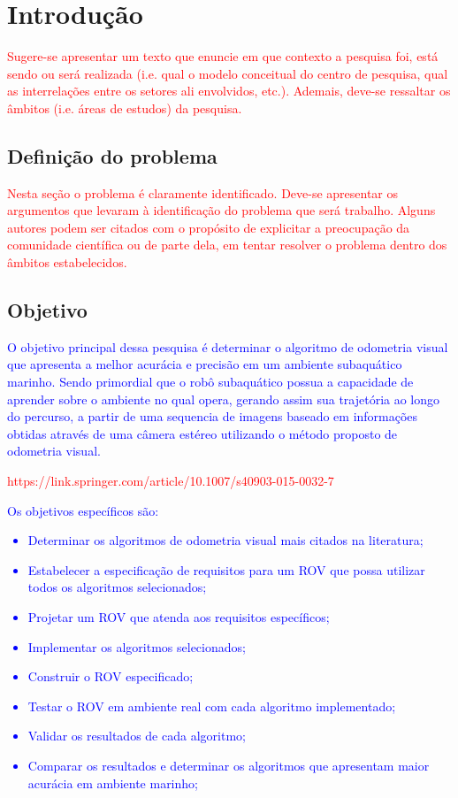 \chapter{Introdu\c{c}\~ao}
\label{chapter:introducao}

\textcolor{red}{Sugere-se apresentar um texto que enuncie em que contexto a pesquisa foi, est\'a sendo ou ser\'a realizada (i.e. qual o modelo conceitual do centro de pesquisa, qual as interrela\c{c}\~oes entre os setores ali envolvidos, etc.). Ademais, deve-se ressaltar os \^ambitos (i.e. \'areas de estudos) da pesquisa.}



\section{Defini\c{c}\~ao do problema}
\label{section:definicaoproblema}

\textcolor{red}{Nesta se\c{c}\~ao o problema \'e claramente identificado. Deve-se apresentar os argumentos que levaram \`a identifica\c{c}\~ao do problema que ser\'a trabalho. Alguns autores podem ser citados com o prop\'osito de explicitar a preocupa\c{c}\~ao da comunidade cient\'ifica ou de parte dela, em tentar resolver o problema dentro dos \^ambitos estabelecidos.}



\section{Objetivo}
\label{section:objetivo}

\textcolor{blue}{
    O objetivo principal dessa pesquisa é determinar o algoritmo de odometria visual que apresenta a melhor acurácia e precisão em um ambiente subaquático marinho. Sendo primordial que o robô subaquático possua a capacidade de aprender sobre o ambiente no qual opera, gerando assim sua trajetória ao longo do percurso, a partir de uma sequencia de imagens baseado em informações obtidas através de uma câmera estéreo utilizando o método proposto de odometria visual.
}

\textcolor{red}{https://link.springer.com/article/10.1007/s40903-015-0032-7}

\textcolor{blue}{
	Os objetivos específicos são:
	\begin{itemize}
		\item Determinar os algoritmos de odometria visual mais citados na literatura;
		\item Estabelecer a especificação de requisitos para um ROV que possa utilizar todos os algoritmos selecionados;
		\item Projetar um ROV que atenda aos requisitos específicos;
		\item Implementar os algoritmos selecionados;
		\item Construir o ROV especificado;
		\item Testar o ROV em ambiente real com cada algoritmo implementado;
		\item Validar os resultados de cada algoritmo;
		\item Comparar os resultados e determinar os algoritmos que apresentam maior acurácia em ambiente marinho;
	\end{itemize}
}


